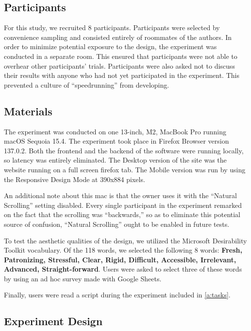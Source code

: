 \documentclass{article}
\begin{document}
\subsection{Participants}

For this study, we recruited 8 participants. Participants were selected by convenience sampling and consisted entirely of roommates of the authors. In order to minimize potential exposure to the design, the experiment was conducted in a separate room. This ensured that participants were not able to overhear other participants’ trials. Participants were also asked not to discuss their results with anyone who had not yet participated in the experiment. This prevented a culture of “speedrunning” from developing.

\subsection{Materials}

The experiment was conducted on one 13-inch, M2, MacBook Pro running macOS Sequoia 15.4. The experiment took place in Firefox Browser version 137.0.2. Both the frontend and the backend of the software were running locally, so latency was entirely eliminated. The Desktop version of the site was the website running on a full screen firefox tab. The Mobile version was run by using the Responsive Design Mode at 390x884 pixels. 

An additional note about this mac is that the owner uses it with the “Natural Scrolling” setting disabled. Every single participant in the experiment remarked on the fact that the scrolling was “backwards,” so as to eliminate this potential source of confusion, “Natural Scrolling” ought to be enabled in future tests.

To test the aesthetic qualities of the design, we utilized the Microsoft Desirability Toolkit vocabulary.\cite{noauthor_microsoft_nodate} Of the 118 words, we selected the following 8 words: \textbf{Fresh, Patronizing, Stressful, Clear, Rigid, Difficult, Accessible, Irrelevant, Advanced, Straight-forward}. Users were asked to select three of these words by using an ad hoc survey made with Google Sheets.

Finally, users were read a script during the experiment included in \autoref{a:tasks}. 

\subsection{Experiment Design}
\end{document}
